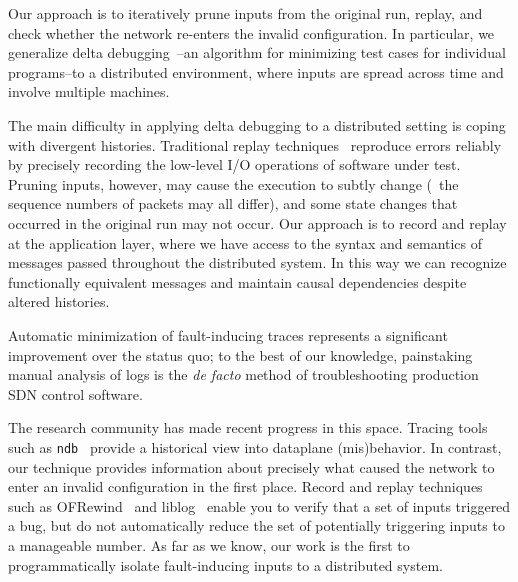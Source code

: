 Our approach is to iteratively
prune inputs from the original run, replay, and
check whether the network re-enters the invalid configuration.
In particular, we generalize delta debugging~\cite{Zeller:2002:SIF:506201.506206}--an algorithm for
minimizing test cases for individual programs--to a distributed environment, where inputs
are spread across time and involve multiple machines. 

The main difficulty in applying delta debugging to a distributed
setting is coping with divergent histories. Traditional replay
techniques~\cite{Dunlap:2002:REI:844128.844148,Geels:2006:RDD:1267359.1267386}
reproduce errors reliably by precisely recording the low-level I/O operations of
software under test. Pruning inputs, however, may cause the execution to
subtly change (\eg~the sequence numbers of packets may all differ), and some
state changes that occurred in the original
run may not occur. Our approach is to record and replay at the application layer,
where we have access to the syntax and semantics of messages passed
throughout the distributed system. In this way we can recognize functionally
equivalent messages and maintain causal dependencies despite altered histories.

Automatic minimization of fault-inducing traces
represents a significant improvement over the status quo;
to the best of our knowledge, painstaking manual analysis of logs is the
{\em de facto} method of troubleshooting production SDN control software.

The research community has made recent progress in this space.
Tracing tools such as {\tt ndb}~\cite{handigol2012debugger} provide
a historical view into dataplane (mis)behavior. In contrast, our technique provides
information about precisely what caused the network to
enter an invalid
configuration in the first place. Record and replay techniques such as
OFRewind~\cite{ofrewind} and liblog~\cite{Geels:2006:RDD:1267359.1267386}
enable you to verify that a set of inputs triggered a bug, but do not automatically reduce
the set of potentially triggering inputs to a manageable number. As far as we know, our work
is the first to programmatically isolate fault-inducing inputs to a distributed
system.



